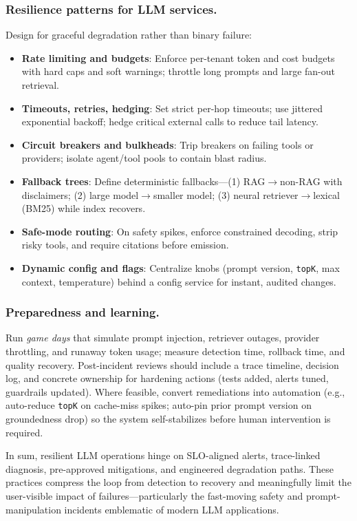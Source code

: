 \subsubsection{Resilience patterns for LLM services.}
Design for graceful degradation rather than binary failure:
\begin{itemize}[leftmargin=1.2em]
\item \textbf{Rate limiting and budgets}: Enforce per-tenant token and cost budgets with hard caps and soft warnings; throttle long prompts and large fan-out retrieval.
\item \textbf{Timeouts, retries, hedging}: Set strict per-hop timeouts; use jittered exponential backoff; hedge critical external calls to reduce tail latency.
\item \textbf{Circuit breakers and bulkheads}: Trip breakers on failing tools or providers; isolate agent/tool pools to contain blast radius.
\item \textbf{Fallback trees}: Define deterministic fallbacks—(1) RAG$\rightarrow$non-RAG with disclaimers; (2) large model$\rightarrow$smaller model; (3) neural retriever$\rightarrow$lexical (BM25) while index recovers.
\item \textbf{Safe-mode routing}: On safety spikes, enforce constrained decoding, strip risky tools, and require citations before emission.
\item \textbf{Dynamic config and flags}: Centralize knobs (prompt version, \texttt{topK}, max context, temperature) behind a config service for instant, audited changes.
\end{itemize}

\subsubsection{Preparedness and learning.}
Run \emph{game days} that simulate prompt injection, retriever outages, provider throttling, and runaway token usage; measure detection time, rollback time, and quality recovery. Post-incident reviews should include a trace timeline, decision log, and concrete ownership for hardening actions (tests added, alerts tuned, guardrails updated). Where feasible, convert remediations into automation (e.g., auto-reduce \texttt{topK} on cache-miss spikes; auto-pin prior prompt version on groundedness drop) so the system self-stabilizes before human intervention is required.

\medskip
In sum, resilient LLM operations hinge on SLO-aligned alerts, trace-linked diagnosis, pre-approved mitigations, and engineered degradation paths. These practices compress the loop from detection to recovery and meaningfully limit the user-visible impact of failures—particularly the fast-moving safety and prompt-manipulation incidents emblematic of modern LLM applications.

